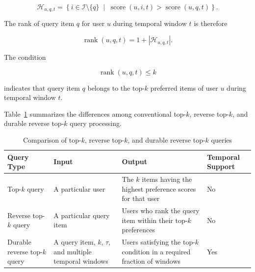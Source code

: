 \begin{equation}
\mathcal{H}_{u,q,t}
=
\left\{
i\in\mathcal{I}\setminus\{q\}
\;\middle|\;
\operatorname{score}(u,i,t)
>
\operatorname{score}(u,q,t)
\right\}.
\label{eq:higher_scored_items}
\end{equation}

The rank of query item $q$ for user $u$ during temporal window $t$ is therefore

\begin{equation}
\operatorname{rank}(u,q,t)
=
1+\left|\mathcal{H}_{u,q,t}\right|.
\label{eq:query_rank}
\end{equation}

The condition

\begin{equation}
\operatorname{rank}(u,q,t)\leq k
\label{eq:topk_condition}
\end{equation}

indicates that query item $q$ belongs to the top-$k$ preferred items of user $u$ during temporal window $t$.

Table~\ref{tab:query_comparison} summarizes the differences among conventional top-$k$, reverse top-$k$, and durable reverse top-$k$ query processing.

\begin{table}[htbp]
\centering
\caption{Comparison of top-$k$, reverse top-$k$, and durable reverse top-$k$ queries}
\label{tab:query_comparison}
\small
\renewcommand{\arraystretch}{1.25}
\setlength{\tabcolsep}{4pt}
\begin{tabularx}{\textwidth}{|p{2.6cm}|X|X|p{1.9cm}|}
\hline
\textbf{Query Type} &
\textbf{Input} &
\textbf{Output} &
\textbf{Temporal Support} \\
\hline

Top-$k$ query &
A particular user &
The $k$ items having the highest preference scores for that user &
No \\
\hline

Reverse top-$k$ query &
A particular query item &
Users who rank the query item within their top-$k$ preferences &
No \\
\hline

Durable reverse top-$k$ query &
A query item, $k$, $\tau$, and multiple temporal windows &
Users satisfying the top-$k$ condition in a required fraction of windows &
Yes \\
\hline
\end{tabularx}
\end{table}

